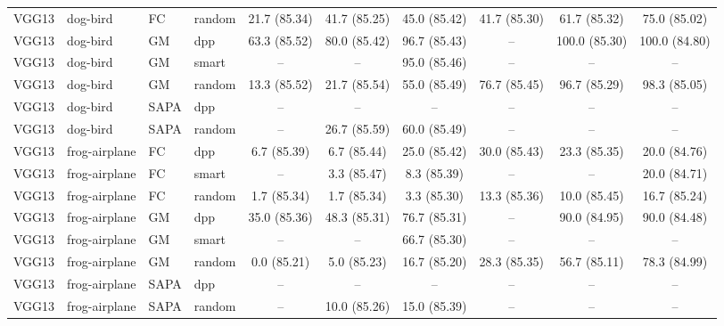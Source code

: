 \begin{table}[h]
{\begin{tabular}{llllcccccc}
VGG13 & dog-bird & FC & random
& 21.7 \small{(85.34)}
& 41.7 \small{(85.25)}
& 45.0 \small{(85.42)}
& 41.7 \small{(85.30)}
& 61.7 \small{(85.32)}
& 75.0 \small{(85.02)} \\
\addlinespace

VGG13 & dog-bird & GM & dpp
& 63.3 \small{(85.52)}
& 80.0 \small{(85.42)}
& 96.7 \small{(85.43)}
& --
& 100.0 \small{(85.30)}
& 100.0 \small{(84.80)} \\

VGG13 & dog-bird & GM & smart
& --
& --
& 95.0 \small{(85.46)}
& --
& --
& -- \\

VGG13 & dog-bird & GM & random
& 13.3 \small{(85.52)}
& 21.7 \small{(85.54)}
& 55.0 \small{(85.49)}
& 76.7 \small{(85.45)}
& 96.7 \small{(85.29)}
& 98.3 \small{(85.05)} \\ [1em]

VGG13 & dog-bird & SAPA & dpp
& --
& --
& --
& --
& --
& -- \\



VGG13 & dog-bird & SAPA & random
& --
& 26.7 \small{(85.59)}
& 60.0 \small{(85.49)}
& --
& --
& -- \\ [1em]




VGG13 & frog-airplane & FC & dpp
& 6.7 \small{(85.39)}
& 6.7 \small{(85.44)}
& 25.0 \small{(85.42)}
& 30.0 \small{(85.43)}
& 23.3 \small{(85.35)}
& 20.0 \small{(84.76)} \\

VGG13 & frog-airplane & FC & smart
& --
& 3.3 \small{(85.47)}
& 8.3 \small{(85.39)}
& --
& --
& 20.0 \small{(84.71)} \\

VGG13 & frog-airplane & FC & random
& 1.7 \small{(85.34)}
& 1.7 \small{(85.34)}
& 3.3 \small{(85.30)}
& 13.3 \small{(85.36)}
& 10.0 \small{(85.45)}
& 16.7 \small{(85.24)} \\ [1em]


VGG13 & frog-airplane & GM & dpp
& 35.0 \small{(85.36)}
& 48.3 \small{(85.31)}
& 76.7 \small{(85.31)}
& --
& 90.0 \small{(84.95)}
& 90.0 \small{(84.48)} \\

VGG13 & frog-airplane & GM & smart
& --
& --
& 66.7 \small{(85.30)}
& --
& --
& -- \\

VGG13 & frog-airplane & GM & random
& 0.0 \small{(85.21)}
& 5.0 \small{(85.23)}
& 16.7 \small{(85.20)}
& 28.3 \small{(85.35)}
& 56.7 \small{(85.11)}
& 78.3 \small{(84.99)} \\ [1em]

VGG13 & frog-airplane & SAPA & dpp
& --
& --
& --
& --
& --
& -- \\


VGG13 & frog-airplane & SAPA & random
& --
& 10.0 \small{(85.26)}
& 15.0 \small{(85.39)}
& --
& --
& -- \\ [0.1em]


\hline
\end{tabular}
}

\end{table}

